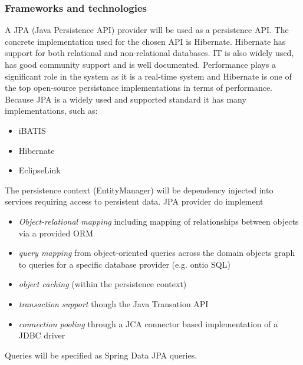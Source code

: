 \documentclass[a4paper,12pt]{report}
\begin{document}
\subsubsection {Frameworks and technologies}
A JPA (Java Persistence API) provider will be used as a persistence API. The concrete implementation used for the chosen API is Hibernate. Hibernate has support for both relational and non-relational databases. IT is also widely used, has good community support and is well documented. Performance plays a significant role in the system as it is a real-time system and Hibernate is one of the top open-source persistance implementations in terms of performance. \newline
Because JPA is a widely used and supported standard it has many implementations, such as:
	\begin {itemize} 
		\item iBATIS
		\item Hibernate
		\item EclipseLink
	\end {itemize} 

The persistence context (EntityManager) will be dependency injected into services requiring access to persistent data. JPA provider do implement

	\begin {itemize} 
		\item \textit{Object-relational mapping} including mapping of relationships between objects via a provided ORM
		\item \textit{query mapping} from object-oriented queries across the domain objects graph to queries for a specific database provider (e.g. ontio SQL)
		\item\textit{object caching} (within the persistence context)
		\item \textit{transaction support} though the Java Transation API
		\item \textit{connection pooling} through a JCA connector based implementation of a JDBC driver
	\end {itemize} 

Queries will be specified as Spring Data JPA queries.
\end{document}
